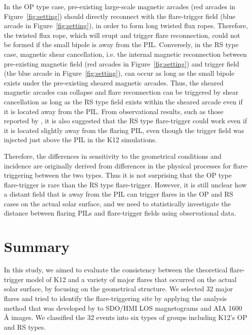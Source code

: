 \documentclass[10pt,preprint2]{aastex}
\begin{document}
In the OP type case, pre-existing large-scale magnetic arcades (red arcades in Figure~\ref{fig:setting}) should directly reconnect with the flare-trigger field (blue arcade in Figure~\ref{fig:setting}), in order to form long twisted flux ropes.
Therefore, the twisted flux rope, which will erupt and trigger flare reconnection, could not be formed if the small bipole is away from the PIL.
Conversely, in the RS type case, magnetic shear cancellation, i.e. the internal magnetic reconnection between pre-existing magnetic field (red arcades in Figure~\ref{fig:setting}) and trigger field (the blue arcade in Figure~\ref{fig:setting}), can occur as long as the small bipole exists under the pre-existing sheared magnetic arcades.
Thus, the sheared magnetic arcades can collapse and flare reconnection can be triggered by shear cancellation as long as the RS type field exists within the sheared arcade even if it is located away from the PIL.
From observational results, such as those reported by \citet{bamba17a}, it is also suggested that the RS type flare-trigger could work even if it is located slightly away from the flaring PIL, even though the trigger field was injected just above the PIL in the K12 simulations.

Therefore, the differences in sensitivity to the geometrical conditions and incidence are originally derived from differences in the physical processes for flare-triggering between the two types.
Thus it is not surprising that the OP type flare-trigger is rare than the RS type flare-trigger.
However, it is still unclear how a distant field that is away from the PIL can trigger flares in the OP and RS cases on the actual solar surface, and we need to statistically investigate the distance between flaring PILs and flare-trigger fields using observational data.



\section{Summary} \label{sec:summary}

In this study, we aimed to evaluate the consistency between the theoretical flare-trigger model of K12 and a variety of major flares that occurred on the actual solar surface, by focusing on the geometrical structure.
We selected 32 major flares and tried to identify the flare-triggering site by applying the analysis method that was developed by \citet{bamba13, bamba14} to SDO/HMI LOS magnetograms and AIA 1600 {\AA} images.
We classified the 32 events into six types of groups including K12's OP and RS types.
\end{document}
